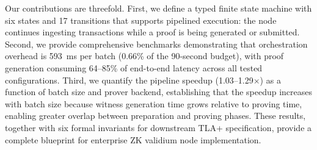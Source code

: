 Our contributions are threefold. First, we define a typed finite state
machine with six states and 17 transitions that supports pipelined execution:
the node continues ingesting transactions while a proof is being generated
or submitted. Second, we provide comprehensive benchmarks demonstrating that
orchestration overhead is 593~ms per batch (0.66\% of the 90-second budget),
with proof generation consuming 64--85\% of end-to-end latency across all
tested configurations. Third, we quantify the pipeline speedup (1.03--1.29$\times$)
as a function of batch size and prover backend, establishing that the
speedup increases with batch size because witness generation time grows
relative to proving time, enabling greater overlap between preparation and
proving phases. These results, together with six formal invariants for
downstream TLA+ specification, provide a complete blueprint for enterprise
ZK validium node implementation.
